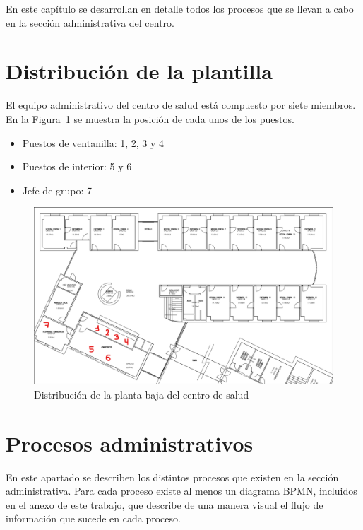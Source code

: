 En este capítulo se desarrollan en detalle todos los procesos que se llevan a cabo en la sección administrativa del centro.

\section{Distribución de la plantilla}

El equipo administrativo del centro de salud está compuesto por siete miembros. En la Figura~\ref{fig:plano-interior} se muestra la posición de cada unos de los puestos.

\begin{itemize}
    \item Puestos de ventanilla: 1, 2, 3 y 4
    \item Puestos de interior: 5 y 6
    \item Jefe de grupo: 7
\end{itemize}

\begin{figure}[H]
    \centering
    \includegraphics[width=\textwidth]{img/plano-interior.png}
    \caption{Distribución de la planta baja del centro de salud}
    \label{fig:plano-interior}
\end{figure}

\section{Procesos administrativos}

En este apartado se describen los distintos procesos que existen en la sección administrativa.
Para cada proceso existe al menos un diagrama BPMN, incluidos en el anexo de este trabajo, que describe de una manera visual el flujo de información que sucede en cada proceso.

